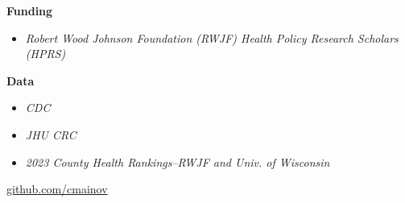 \documentclass[aspectratio=169]{beamer}
\begin{document}
\begin{frame}
\begin{multicols}{2}
		\textbf{Funding}
		\vspace{0.2cm}
		\scriptsize{
			\begin{itemize}
				\item \textit{Robert Wood Johnson Foundation (RWJF) Health Policy Research Scholars (HPRS)}
			\end{itemize}
		}
		
		\textbf{Data}
		\vspace{0.1cm}
		\scriptsize{
			\begin{itemize}
				\item \textit{CDC}
				\item \textit{JHU CRC}
				\item \textit{2023 County Health Rankings--RWJF and Univ. of Wisconsin}
			\end{itemize}
		}
		\vspace{0.4cm}
		
	 \hspace*{2.80cm}	\faGithub \hspace{0.05cm} \textcolor{blue}{\href{https://github.com/cmainov}{github.com/cmainov}}
	\end{multicols}
	
\end{frame}
\end{document}
